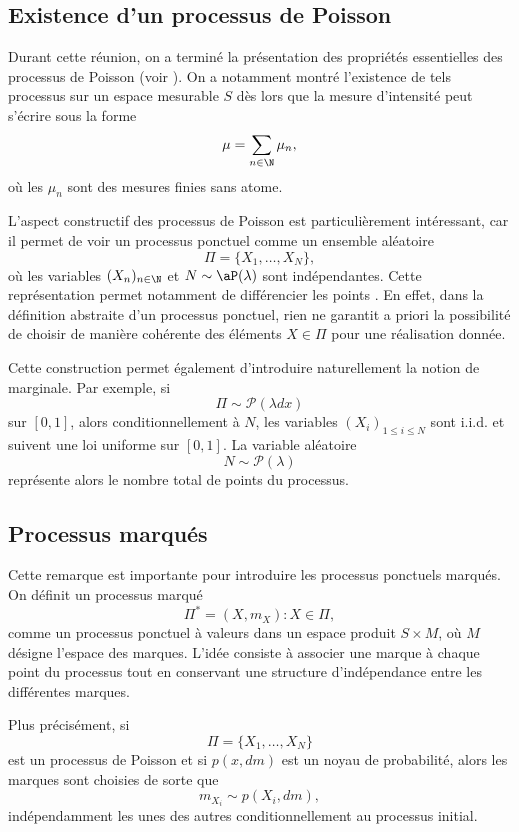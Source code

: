 \subsection{Existence d'un processus de Poisson}

\begin{important}
	Durant cette réunion, on a terminé la présentation des propriétés essentielles des processus de Poisson (voir \cite{king_poisson}). On a notamment montré l'existence de tels processus sur un espace mesurable $S$ dès lors que la mesure d'intensité peut s'écrire sous la forme
	\[
		\mu = \sum_{n \in \N} \mu_n,
	\]
	où les $\mu_n$ sont des mesures finies sans atome.
\end{important}


L'aspect constructif des processus de Poisson est particulièrement intéressant, car il permet de voir un processus ponctuel comme un ensemble aléatoire
\[
	\Pi = \{X_1,\dots,X_N\},
\]
où les variables $(X_n)_{n\in\N}$ et $N \sim \aP(\lambda)$ sont indépendantes. Cette représentation permet notamment de \og différencier les points \fg{}. En effet, dans la définition abstraite d'un processus ponctuel, rien ne garantit a priori la possibilité de choisir de manière cohérente des éléments $X\in \Pi$ pour une réalisation donnée.

Cette construction permet également d'introduire naturellement la notion de marginale. Par exemple, si
\[
	\Pi \sim \mathcal P(\lambda dx)
\]
sur $[0,1]$, alors conditionnellement à $N$, les variables $(X_i)_{1 \le i \le N}$ sont i.i.d. et suivent une loi uniforme sur $[0,1]$. La variable aléatoire
\[
	N \sim \mathcal P(\lambda)
\]
représente alors le nombre total de points du processus.

\subsection{Processus marqués}

Cette remarque est importante pour introduire les processus ponctuels marqués. On définit un processus marqué
\[
	\Pi^* = {(X,m_X) : X \in \Pi},
\]
comme un processus ponctuel à valeurs dans un espace produit $S\times M$, où $M$ désigne l'espace des marques. L'idée consiste à associer une marque à chaque point du processus tout en conservant une structure d'indépendance entre les différentes marques.

Plus précisément, si
\[
	\Pi = \{X_1,\dots,X_N\}
\]
est un processus de Poisson et si $p(x,dm)$ est un noyau de probabilité, alors les marques sont choisies de sorte que
\[
	m_{X_i} \sim p(X_i,dm),
\]
indépendamment les unes des autres conditionnellement au processus initial.

